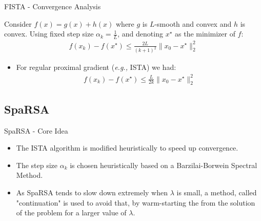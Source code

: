\documentclass{beamer}
\begin{document}
\begin{frame}{FISTA - Convergence Analysis}
    \begin{theorem}
        Consider $f(x)=g(x)+h(x)$ where $g$ is $L$-smooth and convex and $h$ is convex. Using fixed step size $\alpha_k=\frac{1}{L}$, and denoting $x^\star$ as the minimizer of $f$:
        \begin{align*}
            f(x_k)-f(x^\star)\leq\frac{2L}{(k+1)^2}\|x_0-x^\star\|_2^2
        \end{align*}
    \end{theorem}
    \pause
    \begin{itemize}
        \item For regular proximal gradient (\textit{e.g.,} ISTA) we had:
        \begin{align*}
            f(x_k)-f(x^\star)\leq\frac{L}{2k}\|x_0-x^\star\|_2^2
        \end{align*}
    \end{itemize}
\end{frame}



\subsection{SpaRSA}

\begin{frame}{SpaRSA - Core Idea}
\begin{itemize}
    \item The ISTA algorithm is modified heuristically to speed up convergence.
    \item The step size $\alpha_k$ is chosen heuristically based on a Barzilai-Borwein Spectral Method.
    \item As SpaRSA tends to slow down extremely when $\lambda$ is small, a method, called "continuation" is used to avoid that, by warm-starting the from the solution of the problem for a larger value of $\lambda$.
\end{itemize}
\end{frame}
\end{document}
